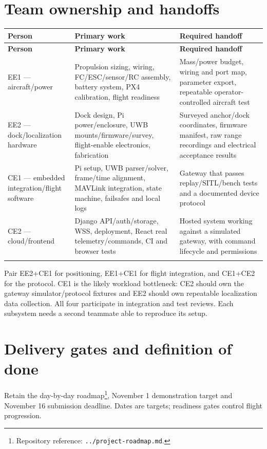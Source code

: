 \documentclass[10pt,letterpaper]{article}
\begin{document}
\section{Team ownership and handoffs}
\begingroup\small\begin{longtable}{P{1.329in}P{2.060in}P{3.256in}}
\toprule{}\textbf{Person} & \textbf{Primary work} & \textbf{Required handoff} \\\midrule\endfirsthead
\toprule{}\textbf{Person} & \textbf{Primary work} & \textbf{Required handoff} \\\midrule\endhead
\bottomrule\endfoot
EE1 --- aircraft/power & Propulsion sizing, wiring, FC/ESC/sensor/RC assembly, battery system, PX4 calibration, flight readiness & Mass/power budget, wiring and port map, parameter export, repeatable operator-controlled aircraft test \\ \addlinespace[2pt]
EE2 --- dock/localization hardware & Dock design, Pi power/enclosure, UWB mounts/firmware/survey, flight-enable electronics, fabrication & Surveyed anchor/dock coordinates, firmware manifest, raw range recordings and electrical acceptance results \\ \addlinespace[2pt]
CE1 --- embedded integration/flight software & Pi setup, UWB parser/solver, frame/time alignment, MAVLink integration, state machine, failsafes and local logs & Gateway that passes replay/SITL/bench tests and a documented device protocol \\ \addlinespace[2pt]
CE2 --- cloud/frontend & Django API/auth/storage, WSS, deployment, React real telemetry/commands, CI and browser tests & Hosted system working against a simulated gateway, with command lifecycle and permissions \\ \addlinespace[2pt]
\end{longtable}\endgroup
Pair EE2+CE1 for positioning, EE1+CE1 for flight integration, and CE1+CE2 for the protocol. CE1 is the likely workload bottleneck: CE2 should own the gateway simulator/protocol fixtures and EE2 should own repeatable localization data collection. All four participate in integration and test reviews. Each subsystem needs a second teammate able to reproduce its setup.

\section{Delivery gates and definition of done}
Retain the day-by-day roadmap\footnote{Repository reference: \nolinkurl{../project-roadmap.md}.}, November 1 demonstration target and November 16 submission deadline. Dates are targets; readiness gates control flight progression.
\end{document}

